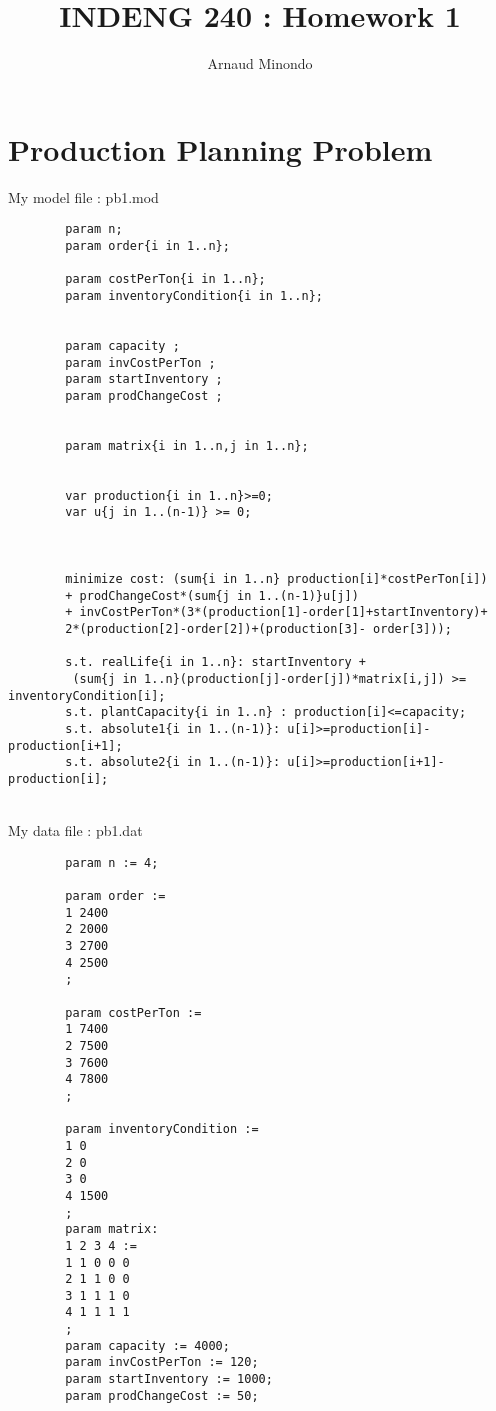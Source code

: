 \documentclass{article}
\title{INDENG 240 : Homework 1}
\author{Arnaud Minondo}
\newenvironment{DDbox}[1]{
\begin{lrbox}{\BBbox}
    \begin{minipage}{\linewidth}}
{\end{minipage}
\end{lrbox}\noindent\colorbox{Zgris}{\usebox{\BBbox}} \\
[.5cm]}
\begin{document}
\maketitle
\section*{Production Planning Problem}

My model file : pb1.mod
\\
\begin{DDbox}{\linewidth}
    \begin{verbatim}
        param n;
        param order{i in 1..n};

        param costPerTon{i in 1..n};
        param inventoryCondition{i in 1..n};


        param capacity ;
        param invCostPerTon ;
        param startInventory ;
        param prodChangeCost ;


        param matrix{i in 1..n,j in 1..n};


        var production{i in 1..n}>=0;
        var u{j in 1..(n-1)} >= 0;



        minimize cost: (sum{i in 1..n} production[i]*costPerTon[i])
        + prodChangeCost*(sum{j in 1..(n-1)}u[j])
        + invCostPerTon*(3*(production[1]-order[1]+startInventory)+
        2*(production[2]-order[2])+(production[3]- order[3]));

        s.t. realLife{i in 1..n}: startInventory +
         (sum{j in 1..n}(production[j]-order[j])*matrix[i,j]) >= inventoryCondition[i];
        s.t. plantCapacity{i in 1..n} : production[i]<=capacity;
        s.t. absolute1{i in 1..(n-1)}: u[i]>=production[i]-production[i+1];
        s.t. absolute2{i in 1..(n-1)}: u[i]>=production[i+1]-production[i];
    \end{verbatim}
\end{DDbox}
\newpage
My data file : pb1.dat
\\
\begin{DDbox}{\linewidth}
    \begin{verbatim}
        param n := 4;

        param order :=
        1 2400
        2 2000
        3 2700
        4 2500
        ;
        
        param costPerTon :=
        1 7400
        2 7500
        3 7600
        4 7800
        ;

        param inventoryCondition :=
        1 0
        2 0
        3 0
        4 1500
        ;
        param matrix:
        1 2 3 4 :=
        1 1 0 0 0
        2 1 1 0 0
        3 1 1 1 0
        4 1 1 1 1
        ; 
        param capacity := 4000;
        param invCostPerTon := 120;
        param startInventory := 1000;
        param prodChangeCost := 50;
    \end{verbatim}
\end{DDbox}
\end{document}
